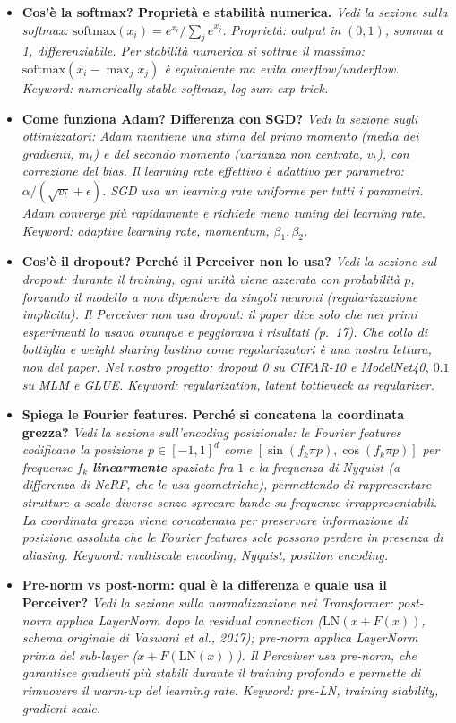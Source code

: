 \documentclass[
  11pt,
]{article}
\begin{document}
\begin{itemize}
  \item \textbf{Cos'è la softmax? Proprietà e stabilità numerica.}
  \textit{Vedi la sezione sulla softmax: $\text{softmax}(x_i) = e^{x_i}/\sum_j e^{x_j}$. Proprietà: output in $(0,1)$, somma a 1, differenziabile. Per stabilità numerica si sottrae il massimo: $\text{softmax}(x_i - \max_j x_j)$ è equivalente ma evita overflow/underflow. Keyword: numerically stable softmax, log-sum-exp trick.}

  \item \textbf{Come funziona Adam? Differenza con SGD?}
  \textit{Vedi la sezione sugli ottimizzatori: Adam mantiene una stima del primo momento (media dei gradienti, $m_t$) e del secondo momento (varianza non centrata, $v_t$), con correzione del bias. Il learning rate effettivo è adattivo per parametro: $\alpha / (\sqrt{v_t} + \epsilon)$. SGD usa un learning rate uniforme per tutti i parametri. Adam converge più rapidamente e richiede meno tuning del learning rate. Keyword: adaptive learning rate, momentum, $\beta_1, \beta_2$.}

  \item \textbf{Cos'è il dropout? Perché il Perceiver non lo usa?}
  \textit{Vedi la sezione sul dropout: durante il training, ogni unità viene azzerata con probabilità $p$, forzando il modello a non dipendere da singoli neuroni (regularizzazione implicita). Il Perceiver non usa dropout: il paper dice solo che nei primi esperimenti lo usava ovunque e peggiorava i risultati (p.~17). Che collo di bottiglia e weight sharing bastino come regolarizzatori è una nostra lettura, non del paper. Nel nostro progetto: dropout 0 su CIFAR-10 e ModelNet40, $0.1$ su MLM e GLUE. Keyword: regularization, latent bottleneck as regularizer.}

  \item \textbf{Spiega le Fourier features. Perché si concatena la coordinata grezza?}
  \textit{Vedi la sezione sull'encoding posizionale: le Fourier features codificano la posizione $p \in [-1,1]^d$ come $[\sin(f_k \pi p), \cos(f_k \pi p)]$ per frequenze $f_k$ \textbf{linearmente} spaziate fra $1$ e la frequenza di Nyquist (a differenza di NeRF, che le usa geometriche), permettendo di rappresentare strutture a scale diverse senza sprecare bande su frequenze irrappresentabili. La coordinata grezza viene concatenata per preservare informazione di posizione assoluta che le Fourier features sole possono perdere in presenza di aliasing. Keyword: multiscale encoding, Nyquist, position encoding.}

  \item \textbf{Pre-norm vs post-norm: qual è la differenza e quale usa il Perceiver?}
  \textit{Vedi la sezione sulla normalizzazione nei Transformer: post-norm applica LayerNorm \emph{dopo} la residual connection ($\text{LN}(x + F(x))$, schema originale di Vaswani et al., 2017); pre-norm applica LayerNorm \emph{prima} del sub-layer ($x + F(\text{LN}(x))$). Il Perceiver usa pre-norm, che garantisce gradienti più stabili durante il training profondo e permette di rimuovere il warm-up del learning rate. Keyword: pre-LN, training stability, gradient scale.}

\end{itemize}
\end{document}
